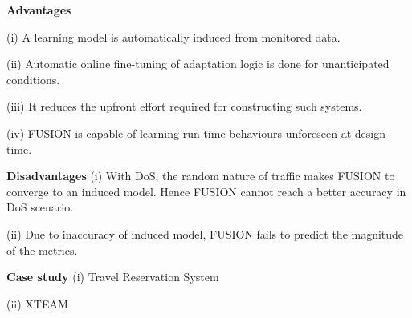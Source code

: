 \begin{compactitem}
\item[\textbf{Advantages}] 

(i) A learning model is automatically induced from monitored data.

(ii) Automatic online fine-tuning of adaptation logic is done for unanticipated conditions.

(iii) It reduces the upfront effort required for constructing such systems.

(iv) FUSION is capable of learning run-time behaviours unforeseen at design-time.


\item[\textbf{Disadvantages}] 
(i) With DoS, the random nature of traffic makes FUSION to converge to an induced model. Hence FUSION cannot reach a better accuracy in DoS scenario. 

(ii) Due to inaccuracy of induced model, FUSION fails to predict the magnitude of the metrics.


\item[\textbf{Case study}] 
(i) Travel Reservation System

(ii) XTEAM

\end{compactitem}
